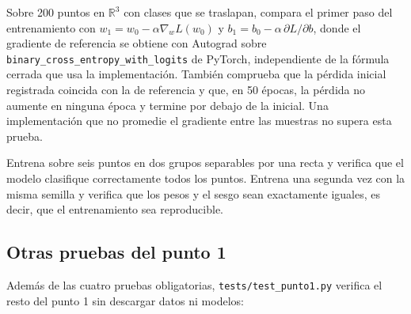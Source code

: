 \begin{description}[style=nextline]
    \item[\texttt{test\_train\_follows\_cross\_entropy\_gradient}] Sobre 200
    puntos en $\mathbb{R}^3$ con clases que se traslapan, compara el primer
    paso del entrenamiento con $w_1 = w_0 - \alpha\nabla_w L(w_0)$ y
    $b_1 = b_0 - \alpha\,\partial L/\partial b$, donde el gradiente de
    referencia se obtiene con Autograd sobre
    \texttt{binary\_cross\_entropy\_with\_logits} de PyTorch, independiente
    de la fórmula cerrada que usa la implementación. También comprueba que la
    pérdida inicial registrada coincida con la de referencia y que, en 50
    épocas, la pérdida no aumente en ninguna época y termine por debajo de la
    inicial. Una implementación que no promedie el gradiente entre las
    muestras no supera esta prueba.
    \item[\texttt{test\_train\_separates\_linearly\_separable\_data}] Entrena
    sobre seis puntos en dos grupos separables por una recta y verifica que
    el modelo clasifique correctamente todos los puntos. Entrena una segunda
    vez con la misma semilla y verifica que los pesos y el sesgo sean
    exactamente iguales, es decir, que el entrenamiento sea reproducible.
\end{description}

\subsection{Otras pruebas del punto 1}

Además de las cuatro pruebas obligatorias, \texttt{tests/test\_punto1.py}
verifica el resto del punto 1 sin descargar datos ni modelos:


